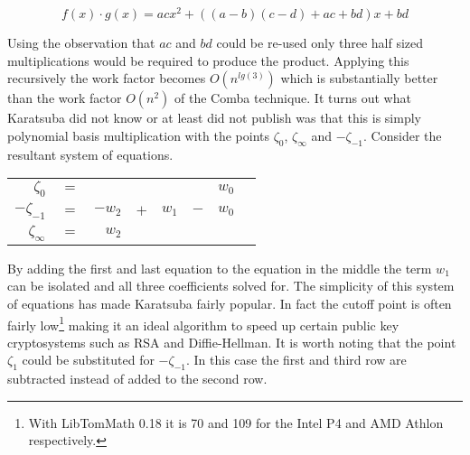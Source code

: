 \documentclass[b5paper]{book}
\begin{document}
\begin{equation}
f(x) \cdot g(x) = acx^2 + ((a - b)(c - d) + ac + bd)x + bd
\end{equation}

Using the observation that $ac$ and $bd$ could be re-used only three half sized multiplications would be required to produce the product.  Applying
this recursively the work factor becomes $O(n^{lg(3)})$ which is substantially better than the work factor $O(n^2)$ of the Comba technique.  It turns 
out what Karatsuba did not know or at least did not publish was that this is simply polynomial basis multiplication with the points 
$\zeta_0$, $\zeta_{\infty}$ and $-\zeta_{-1}$.  Consider the resultant system of equations.

\begin{center}
\begin{tabular}{rcrcrcrc}
$\zeta_{0}$ &      $=$ &  &  &  & & $w_0$ \\
$-\zeta_{-1}$ &    $=$ & $-w_2$ & $+$ & $w_1$ & $-$ & $w_0$ \\
$\zeta_{\infty}$ & $=$ & $w_2$ &  & &  & \\
\end{tabular}
\end{center}

By adding the first and last equation to the equation in the middle the term $w_1$ can be isolated and all three coefficients solved for.  The simplicity
of this system of equations has made Karatsuba fairly popular.  In fact the cutoff point is often fairly low\footnote{With LibTomMath 0.18 it is 70 and 109 for the Intel P4 and AMD Athlon respectively.}
making it an ideal algorithm to speed up certain public key cryptosystems such as RSA and Diffie-Hellman.  It is worth noting that the point 
$\zeta_1$ could be substituted for $-\zeta_{-1}$.  In this case the first and third row are subtracted instead of added to the second row.  
\end{document}
